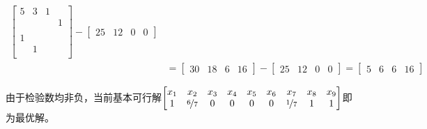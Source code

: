 \documentclass{ctexart}
\begin{document}
\begin{example} [用修正单纯形法求分数背包问题]
\begin{align*}
\begin{bmatrix}
            5 & 3 & 1     \\
              &   &   & 1 \\
              &           \\
            1             \\
              & 1         \\
        \end{bmatrix} -
        \begin{bmatrix}
            25 & 12 & 0 & 0
        \end{bmatrix}                                                 \\
                       & =
        \begin{bmatrix}
            30 & 18 & 6 & 16
        \end{bmatrix} -
        \begin{bmatrix}
            25 & 12 & 0 & 0
        \end{bmatrix} =
        \begin{bmatrix}
            5 & 6 & 6 & 16
        \end{bmatrix}
    \end{align*}

    由于检验数均非负，当前基本可行解$\begin{bmatrix}
            x_1 & x_2             & x_3 & x_4 & x_5 & x_6 & x_7             & x_8 & x_9 \\
            1   & \nicefrac{6}{7} & 0   & 0   & 0   & 0   & \nicefrac{1}{7} & 1   & 1
        \end{bmatrix}$即为最优解。
\end{example}
\end{document}

